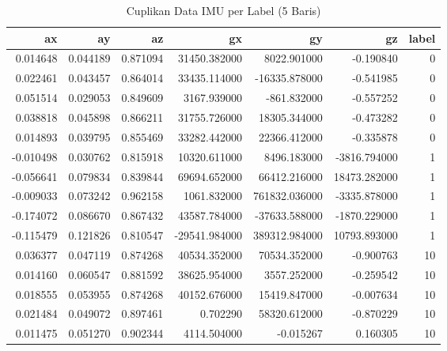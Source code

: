 \begin{table}[htbp]
\centering
\begin{table}
\caption{Cuplikan Data IMU per Label (5 Baris)}
\label{tab:cuplikan_imu}
\begin{tabular}{rrrrrrr}
\toprule
ax & ay & az & gx & gy & gz & label \\
\midrule
0.014648 & 0.044189 & 0.871094 & 31450.382000 & 8022.901000 & -0.190840 & 0 \\
0.022461 & 0.043457 & 0.864014 & 33435.114000 & -16335.878000 & -0.541985 & 0 \\
0.051514 & 0.029053 & 0.849609 & 3167.939000 & -861.832000 & -0.557252 & 0 \\
0.038818 & 0.045898 & 0.866211 & 31755.726000 & 18305.344000 & -0.473282 & 0 \\
0.014893 & 0.039795 & 0.855469 & 33282.442000 & 22366.412000 & -0.335878 & 0 \\
-0.010498 & 0.030762 & 0.815918 & 10320.611000 & 8496.183000 & -3816.794000 & 1 \\
-0.056641 & 0.079834 & 0.839844 & 69694.652000 & 66412.216000 & 18473.282000 & 1 \\
-0.009033 & 0.073242 & 0.962158 & 1061.832000 & 761832.036000 & -3335.878000 & 1 \\
-0.174072 & 0.086670 & 0.867432 & 43587.784000 & -37633.588000 & -1870.229000 & 1 \\
-0.115479 & 0.121826 & 0.810547 & -29541.984000 & 389312.984000 & 10793.893000 & 1 \\
0.036377 & 0.047119 & 0.874268 & 40534.352000 & 70534.352000 & -0.900763 & 10 \\
0.014160 & 0.060547 & 0.881592 & 38625.954000 & 3557.252000 & -0.259542 & 10 \\
0.018555 & 0.053955 & 0.874268 & 40152.676000 & 15419.847000 & -0.007634 & 10 \\
0.021484 & 0.049072 & 0.897461 & 0.702290 & 58320.612000 & -0.870229 & 10 \\
0.011475 & 0.051270 & 0.902344 & 4114.504000 & -0.015267 & 0.160305 & 10 \\
\bottomrule
\end{tabular}
\end{table}
\end{table}
